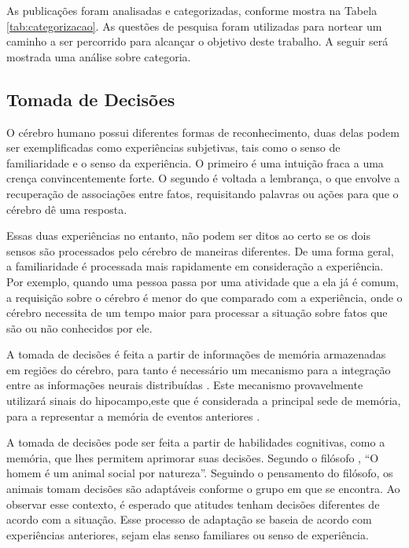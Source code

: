 As publicações foram analisadas e categorizadas, conforme mostra na Tabela \ref{tab:categorizacao}. As questões de pesquisa foram utilizadas para nortear um caminho a ser percorrido para alcançar o objetivo deste trabalho. A seguir será mostrada uma análise sobre categoria.

\subsection{Tomada de Decisões}
\label{subsec:decisoes}

O cérebro humano possui diferentes formas de reconhecimento, duas delas podem ser exemplificadas como experiências subjetivas, tais como o senso de familiaridade e o senso da experiência. O primeiro é uma intuição fraca a uma crença convincentemente forte. O segundo é voltada a lembrança, o que envolve a recuperação de associações entre fatos, requisitando palavras ou ações para que o cérebro dê uma resposta.

Essas duas experiências no entanto, não podem ser ditos ao certo se os dois sensos são processados pelo cérebro de maneiras diferentes. De uma forma geral, a familiaridade é processada mais rapidamente em consideração a experiência. Por exemplo, quando uma pessoa passa por uma atividade que a ela já é comum, a requisição sobre o cérebro é menor do que comparado com a experiência, onde o cérebro necessita de um tempo maior para processar a situação sobre fatos que são ou não conhecidos por ele. 

A tomada de decisões é feita a partir de informações de memória armazenadas em regiões do cérebro, para tanto é necessário um mecanismo para a integração entre as informações neurais distribuídas \cite{buzsaki}. Este mecanismo provavelmente utilizará sinais do hipocampo,este que é considerada a principal sede de memória, para a representar a memória de eventos anteriores \cite{eichenbaum}.

A tomada de decisões pode ser feita a partir de habilidades cognitivas, como a memória, que lhes permitem aprimorar suas decisões. Segundo o filósofo \cite{aristoteles}, “O homem é um animal social por natureza”. Seguindo o pensamento do filósofo, os animais tomam decisões são adaptáveis conforme o grupo em que se encontra. Ao observar esse contexto, é esperado que atitudes tenham decisões diferentes de acordo com a situação. Esse processo de adaptação se baseia de acordo com experiências anteriores, sejam elas senso familiares ou senso de experiência.

